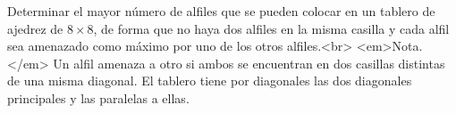 Determinar el mayor número de alfiles que se pueden colocar en un tablero de ajedrez de $8 \times 8$, de forma que no haya dos alfiles en la misma casilla y cada alfil sea amenazado como máximo por uno de los otros alfiles.<br>
<em>Nota.</em> Un alfil amenaza a otro si ambos se encuentran en dos casillas distintas de una misma diagonal. El tablero tiene por diagonales las dos diagonales principales y las paralelas a ellas.
